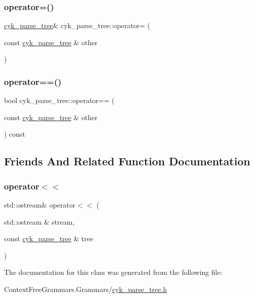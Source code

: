 \mbox{\label{classcyk__parse__tree_adfb07100edf8a49486996cad7d75c9ba}} 
\subsubsection{\texorpdfstring{operator=()}{operator=()}}
{\footnotesize\ttfamily \mbox{\hyperlink{classcyk__parse__tree}{cyk\+\_\+parse\+\_\+tree}}\& cyk\+\_\+parse\+\_\+tree\+::operator= (\begin{DoxyParamCaption}\item[{const \mbox{\hyperlink{classcyk__parse__tree}{cyk\+\_\+parse\+\_\+tree}} \&}]{other }\end{DoxyParamCaption})\hspace{0.3cm}{\ttfamily [inline]}}

\mbox{\label{classcyk__parse__tree_a4e8f3ee73ba798d2cf73db68bb12492c}} 
\subsubsection{\texorpdfstring{operator==()}{operator==()}}
{\footnotesize\ttfamily bool cyk\+\_\+parse\+\_\+tree\+::operator== (\begin{DoxyParamCaption}\item[{const \mbox{\hyperlink{classcyk__parse__tree}{cyk\+\_\+parse\+\_\+tree}} \&}]{other }\end{DoxyParamCaption}) const\hspace{0.3cm}{\ttfamily [inline]}}



\subsection{Friends And Related Function Documentation}
\mbox{\label{classcyk__parse__tree_ae088cc1ec70e4eb9c66a5fb12a81a5b8}} 
\subsubsection{\texorpdfstring{operator$<$$<$}{operator<<}}
{\footnotesize\ttfamily std\+::ostream\& operator$<$$<$ (\begin{DoxyParamCaption}\item[{std\+::ostream \&}]{stream,  }\item[{const \mbox{\hyperlink{classcyk__parse__tree}{cyk\+\_\+parse\+\_\+tree}} \&}]{tree }\end{DoxyParamCaption})\hspace{0.3cm}{\ttfamily [friend]}}



The documentation for this class was generated from the following file\+:\begin{DoxyCompactItemize}
\item 
Context\+Free\+Grammars.\+Grammars/\mbox{\hyperlink{cyk__parse__tree_8h}{cyk\+\_\+parse\+\_\+tree.\+h}}\end{DoxyCompactItemize}
